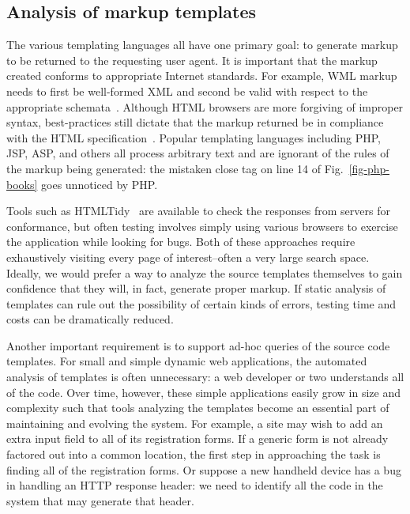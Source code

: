 \documentclass{www2003-submission}
\newcommand{\figref}[1]{Fig.~\ref{fig-#1}}
\begin{document}
\subsection{Analysis of markup templates}

The various templating languages all have one primary goal: to
generate markup to be returned to the requesting user agent.  It is
important that the markup created conforms to appropriate Internet
standards.  For example, WML markup needs to first be well-formed XML
and second be valid with respect to the appropriate
schemata~\cite{WML}.  Although HTML browsers are more forgiving of
improper syntax, best-practices still dictate that the markup returned
be in compliance with the HTML specification~\cite{HTML}.  
Popular templating languages including PHP, JSP, ASP, and others
all process arbitrary text and are ignorant of the rules of the markup
being generated: the mistaken close tag on line 14 of \figref{php-books}
goes unnoticed by PHP.

Tools such as HTMLTidy~\cite{HTMLTidy} are available to check the
responses from servers for conformance, but often testing involves
simply using various browsers to exercise the application while
looking for bugs.  Both of these approaches require exhaustively
visiting every page of interest--often a very large search space.
Ideally, we would prefer a way to analyze the source templates
themselves to gain confidence that they will, in fact, generate proper
markup.  If static analysis of templates can rule out the possibility
of certain kinds of errors, testing time and costs can be dramatically
reduced.

Another important requirement is to support ad-hoc queries of
the source code templates. For small and simple dynamic web applications,
the automated analysis of templates is often unnecessary: a web
developer or two understands all of the code.  Over time, however,
these simple applications easily grow in size and complexity such that
tools analyzing the templates become an essential part of maintaining
and evolving the system. For example, a site may wish to add an extra
input field to all of its registration forms.  If a generic form is
not already factored out into a common location, the first step in
approaching the task is finding all of the registration forms.  Or
suppose a new handheld device has a bug in handling an HTTP response
header: we need to identify all the code in the system that may
generate that header.
\end{document}
